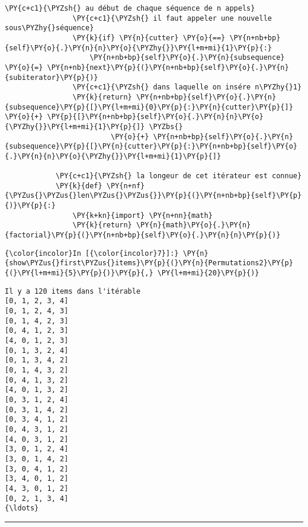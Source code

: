 \begin{Verbatim}[commandchars=\\\{\}]
                \PY{c+c1}{\PYZsh{} au début de chaque séquence de n appels}
                \PY{c+c1}{\PYZsh{} il faut appeler une nouvelle sous\PYZhy{}séquence}
                \PY{k}{if} \PY{n}{cutter} \PY{o}{==} \PY{n+nb+bp}{self}\PY{o}{.}\PY{n}{n}\PY{o}{\PYZhy{}}\PY{l+m+mi}{1}\PY{p}{:}
                    \PY{n+nb+bp}{self}\PY{o}{.}\PY{n}{subsequence} \PY{o}{=} \PY{n+nb}{next}\PY{p}{(}\PY{n+nb+bp}{self}\PY{o}{.}\PY{n}{subiterator}\PY{p}{)}
                \PY{c+c1}{\PYZsh{} dans laquelle on insére n\PYZhy{}1}
                \PY{k}{return} \PY{n+nb+bp}{self}\PY{o}{.}\PY{n}{subsequence}\PY{p}{[}\PY{l+m+mi}{0}\PY{p}{:}\PY{n}{cutter}\PY{p}{]} \PY{o}{+} \PY{p}{[}\PY{n+nb+bp}{self}\PY{o}{.}\PY{n}{n}\PY{o}{\PYZhy{}}\PY{l+m+mi}{1}\PY{p}{]} \PYZbs{}
                         \PY{o}{+} \PY{n+nb+bp}{self}\PY{o}{.}\PY{n}{subsequence}\PY{p}{[}\PY{n}{cutter}\PY{p}{:}\PY{n+nb+bp}{self}\PY{o}{.}\PY{n}{n}\PY{o}{\PYZhy{}}\PY{l+m+mi}{1}\PY{p}{]}
        
            \PY{c+c1}{\PYZsh{} la longeur de cet itérateur est connue}
            \PY{k}{def} \PY{n+nf}{\PYZus{}\PYZus{}len\PYZus{}\PYZus{}}\PY{p}{(}\PY{n+nb+bp}{self}\PY{p}{)}\PY{p}{:}
                \PY{k+kn}{import} \PY{n+nn}{math}
                \PY{k}{return} \PY{n}{math}\PY{o}{.}\PY{n}{factorial}\PY{p}{(}\PY{n+nb+bp}{self}\PY{o}{.}\PY{n}{n}\PY{p}{)}
\end{Verbatim}


    \begin{Verbatim}[commandchars=\\\{\}]
{\color{incolor}In [{\color{incolor}7}]:} \PY{n}{show\PYZus{}first\PYZus{}items}\PY{p}{(}\PY{n}{Permutations2}\PY{p}{(}\PY{l+m+mi}{5}\PY{p}{)}\PY{p}{,} \PY{l+m+mi}{20}\PY{p}{)}
\end{Verbatim}


    \begin{Verbatim}[commandchars=\\\{\}]
Il y a 120 items dans l'itérable
[0, 1, 2, 3, 4]
[0, 1, 2, 4, 3]
[0, 1, 4, 2, 3]
[0, 4, 1, 2, 3]
[4, 0, 1, 2, 3]
[0, 1, 3, 2, 4]
[0, 1, 3, 4, 2]
[0, 1, 4, 3, 2]
[0, 4, 1, 3, 2]
[4, 0, 1, 3, 2]
[0, 3, 1, 2, 4]
[0, 3, 1, 4, 2]
[0, 3, 4, 1, 2]
[0, 4, 3, 1, 2]
[4, 0, 3, 1, 2]
[3, 0, 1, 2, 4]
[3, 0, 1, 4, 2]
[3, 0, 4, 1, 2]
[3, 4, 0, 1, 2]
[4, 3, 0, 1, 2]
[0, 2, 1, 3, 4]
{\ldots}

    \end{Verbatim}

    \begin{center}\rule{0.5\linewidth}{\linethickness}\end{center}

